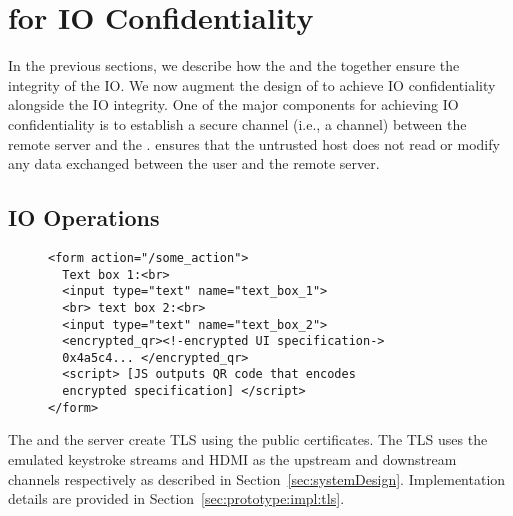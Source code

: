 \section{\name for IO Confidentiality}
\label{sec:confidentiality}


In the previous sections, we describe how the \name \js and the \device together ensure the integrity of the IO. We now augment the design of \name to achieve IO confidentiality alongside the IO integrity. One of the major components for achieving IO confidentiality is to establish a secure channel (i.e., a \tls channel) between the remote server and the \device. \tls ensures that the untrusted host does not read or modify any data exchanged between the user and the remote server.


\subsection{IO Operations}
\label{sec:confidentiality:io}

\begin{figure}[t]
\small
\begin{lstlisting}[mathescape=true]
<form action="/some_action">
  Text box 1:<br>
  <input type="text" name="text_box_1">
  <br> text box 2:<br>
  <input type="text" name="text_box_2">
  <encrypted_qr><!-encrypted UI specification->
  0x4a5c4... </encrypted_qr>
  <script> [JS outputs QR code that encodes 
  encrypted specification] </script>
</form> 
\end{lstlisting}
\spacesave 
\end{figure}




 The \device and the server create TLS using the public certificates. The TLS uses the emulated keystroke streams and HDMI as the upstream and downstream channels respectively as described in Section~\ref{sec:systemDesign}. Implementation details are provided in Section~\ref{sec:prototype:impl:tls}. 

